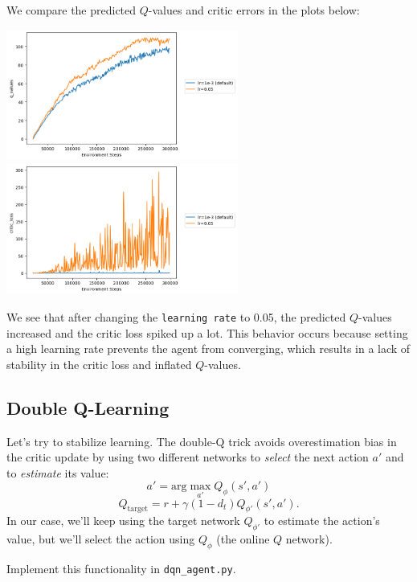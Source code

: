 \begin{itemize}
    \begin{sol}
        We compare the predicted $Q$-values and critic errors in the plots below:
        \begin{center}
            \includegraphics[width=3in]{../q2.4_cartpole_qvalues.png}
            \hspace{0.25cm}
            \includegraphics[width=3in]{../q2.4_cartpole_criticloss.png}
        \end{center}
        We see that after changing the \texttt{learning rate} to 0.05, the predicted $Q$-values increased and the critic loss spiked up a lot. This behavior occurs because setting a high learning rate prevents the agent from converging, which results in a lack of stability in the critic loss and inflated $Q$-values.
    \end{sol}
\end{itemize}

\subsection{Double Q-Learning}
Let's try to stabilize learning. The double-Q trick avoids overestimation bias in the critic update by using two different networks to \textit{select} the next action $a'$ and to \textit{estimate} its value:
\[a' = \textrm{arg}\max_{a'} Q_{\phi}(s', a')\]
\[Q_{\textrm{target}} = r + \gamma(1-d_t) Q_{\phi'}(s', a').\]
In our case, we'll keep using the target network $Q_{\phi'}$ to estimate the action's value, but we'll select the action using $Q_{\phi}$ (the online $Q$ network).

Implement this functionality in \verb|dqn_agent.py|.

